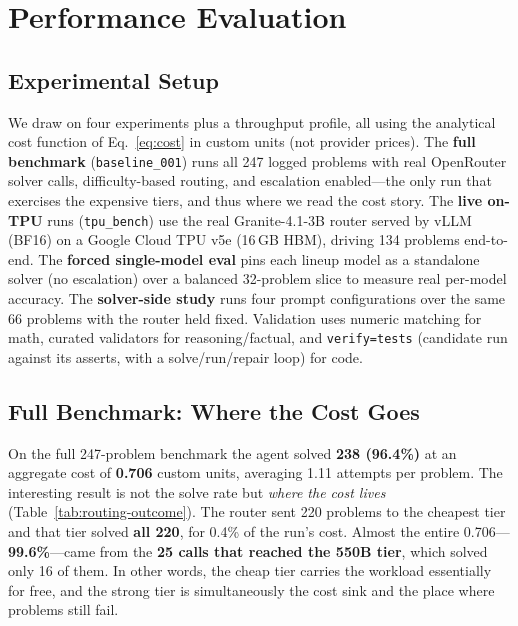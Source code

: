 \documentclass[10pt]{article}
\begin{document}
\section{Performance Evaluation}
\label{sec:eval}

\subsection{Experimental Setup}
\label{sec:setup}
We draw on four experiments plus a throughput profile, all using the analytical cost
function of Eq.~\eqref{eq:cost} in custom units (not provider prices). The
\textbf{full benchmark} (\texttt{baseline\_001}) runs all 247 logged problems with real
OpenRouter solver calls, difficulty-based routing, and escalation enabled---the only
run that exercises the expensive tiers, and thus where we read the cost story. The
\textbf{live on-TPU} runs (\texttt{tpu\_bench}) use the real Granite-4.1-3B router
served by vLLM (BF16) on a Google Cloud TPU v5e (16\,GB HBM), driving 134 problems
end-to-end. The \textbf{forced single-model eval} pins each lineup model as a standalone
solver (no escalation) over a balanced 32-problem slice to measure real per-model
accuracy. The \textbf{solver-side study} runs four prompt configurations over the same
66 problems with the router held fixed. Validation uses numeric matching for math,
curated validators for reasoning/factual, and \texttt{verify=tests} (candidate run
against its asserts, with a solve/run/repair loop) for code.

\subsection{Full Benchmark: Where the Cost Goes}
\label{sec:fullbench}
On the full 247-problem benchmark the agent solved \textbf{238 (96.4\%)} at an
aggregate cost of \textbf{0.706} custom units, averaging 1.11 attempts per problem.
The interesting result is not the solve rate but \emph{where the cost lives}
(Table~\ref{tab:routing-outcome}). The router sent 220 problems to the cheapest tier
and that tier solved \textbf{all 220}, for 0.4\% of the run's cost. Almost the entire
0.706---\textbf{99.6\%}---came from the \textbf{25 calls that reached the 550B tier},
which solved only 16 of them. In other words, the cheap tier carries the workload
essentially for free, and the strong tier is simultaneously the cost sink and the
place where problems still fail.
\end{document}
